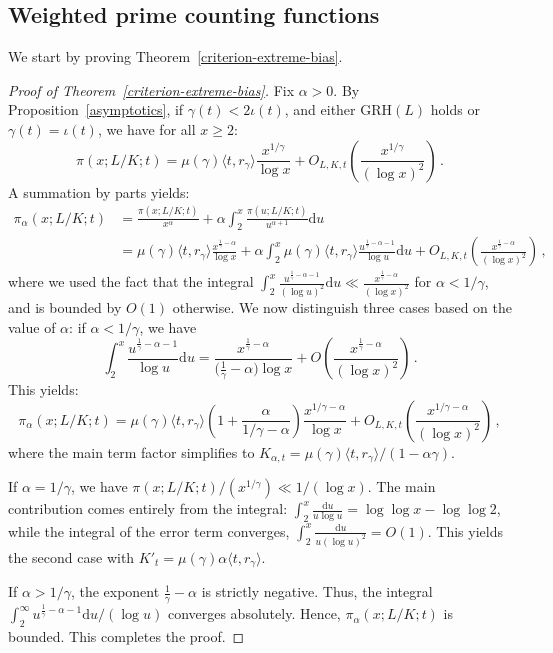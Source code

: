 \documentclass[12pt]{amsart}
\numberwithin{equation}{section}
\theoremstyle{definition}
\theoremstyle{remark}
\begin{document}
\subsection{Weighted prime counting functions}
We start by proving Theorem~\ref{criterion-extreme-bias}.
\begin{proof}[Proof of Theorem~\ref{criterion-extreme-bias}]
Fix $\alpha > 0$. By Proposition~\ref{asymptotics}, if $\gamma(t) < 2\iota(t)$, and either $\mathrm{GRH}(L)$ holds or $\gamma(t) = \iota(t)$, we have for all $x \ge 2$:
\[\pi(x; L/K; t) = \mu(\gamma)\langle t, r_\gamma\rangle \frac{x^{1/\gamma}}{\log x} + O_{L,K,t}\left(\frac{x^{1/\gamma}}{(\log x)^2}\right)\, .\]
A summation by parts yields:
\begin{align}
\pi_\alpha(x; L/K; t) &= \frac{\pi(x; L/K; t)}{x^\alpha} + \alpha \int_2^x \frac{\pi(u; L/K; t)}{u^{\alpha+1}} \mathrm{d}u \label{Sumpartspialpha} \\
&= \mu(\gamma)\langle t, r_\gamma\rangle \frac{x^{\frac{1}{\gamma} - \alpha}}{\log x} + \alpha \int_2^x \mu(\gamma)\langle t, r_\gamma\rangle \frac{u^{\frac{1}{\gamma} - \alpha - 1}}{\log u} \mathrm{d}u + O_{L,K,t}\left(\frac{x^{\frac{1}{\gamma} - \alpha}}{(\log x)^2}\right)\, , \nonumber
\end{align}
where we used the fact that the integral $\int_2^x \frac{u^{\frac{1}{\gamma} - \alpha - 1}}{(\log u)^2} \mathrm{d}u \ll \frac{x^{\frac{1}{\gamma} - \alpha}}{(\log x)^2}$ for $\alpha < 1/\gamma$, and is bounded by $O(1)$ otherwise. We now distinguish three cases based on the value of $\alpha$: if $\alpha < 1/\gamma$, we have \[\int_2^x \frac{u^{\frac{1}{\gamma} - \alpha - 1}}{\log u} \mathrm{d}u = \frac{x^{\frac{1}{\gamma} - \alpha}}{\bigl(\frac{1}{\gamma} - \alpha\bigr)\log x} + O\left(\frac{x^{\frac{1}{\gamma}- \alpha}}{(\log x)^2}\right)\, .\] This yields:
\[\pi_\alpha(x; L/K; t) = \mu(\gamma)\langle t, r_\gamma\rangle \left( 1 + \frac{\alpha}{1/\gamma - \alpha} \right) \frac{x^{1/\gamma - \alpha}}{\log x} + O_{L,K,t}\left(\frac{x^{1/\gamma - \alpha}}{(\log x)^2}\right)\, ,\]
where the main term factor simplifies to $K_{\alpha,t} = \mu(\gamma)\langle t, r_\gamma\rangle/(1 - \alpha\gamma)$.

If $\alpha = 1/\gamma$, we have $\pi(x;L/K;t)/(x^{1/\gamma}) \ll 1/(\log x)$. The main contribution comes entirely from the integral:
\(\int_2^x \frac{\mathrm{d}u}{u \log u} = \log \log x - \log \log 2\),
while the integral of the error term converges, $\int_2^x \frac{\mathrm{d}u}{u(\log u)^2} = O(1)$. This yields the second case with $K'_t = \mu(\gamma)\alpha\langle t, r_\gamma\rangle  $.

If $\alpha > 1/\gamma$, the exponent $\frac{1}{\gamma}- \alpha$ is strictly negative. Thus, the integral $\int_2^\infty u^{\frac{1}{\gamma} - \alpha - 1}\mathrm{d}u/(\log u) $ converges absolutely. Hence, $\pi_\alpha(x; L/K; t)$ is bounded. This completes the proof.
\end{proof}
\end{document}
